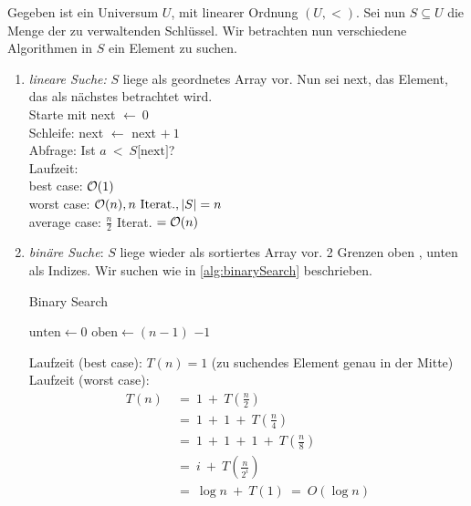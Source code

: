     Gegeben ist ein Universum $U$, mit linearer Ordnung $(U, <)$. Sei nun $S \subseteq U$ die Menge der zu verwaltenden Schlüssel. Wir betrachten nun verschiedene Algorithmen in $S$ ein Element zu suchen.
    \begin{enumerate}[1.] 
        \item \emph{lineare Suche:} $S$ liege als geordnetes Array vor. Nun sei next, das Element, das als nächstes betrachtet wird. \\
        Starte mit next $\leftarrow~0$\\
        Schleife: next $\leftarrow$ next $+~1$\\
        Abfrage: Ist $a~<~S\lbrack\text{next}\rbrack$?\\
        Laufzeit:\\
        best case: $\mathcal{O}(1)$\\
        worst case: $\mathcal{O}(n), n \text{ Iterat.}, |S| = n$\\
        average case: $\frac{n}{2}$ Iterat. $= \mathcal{O}(n)$
        \item \emph{binäre Suche}: $S$ liege wieder als sortiertes Array vor. 2 Grenzen oben , unten als Indizes. Wir suchen wie in \autoref{alg:binarySearch} beschrieben.
            \begin{algorithm}
        		\caption{Binary Search}
        		\label{alg:binarySearch}
        		\begin{algorithmic}[1]
        			    \State $\text{unten} \gets 0$
        			    \State $\text{oben} \gets (n-1)$ 
                            \Else 
                            \EndIf    
        				\EndWhile
        				\State \Return $-1$
        			\EndFunction
        		\end{algorithmic}
        	\end{algorithm}
        Laufzeit (best case): $T(n) = 1$ (zu suchendes Element genau in der Mitte)\\
        Laufzeit (worst case): 
        \begin{align*}
            T(n)~&=~1~+~T \left( \frac{n}{2} \right)\\
            &=~1~+~1~+~T \left( \frac{n}{4} \right)\\
            &=~1~+~1~+~1~+~T \left( \frac{n}{8} \right)\\
            &=~i~+~T \left( \frac{n}{2^{i}} \right)\tag{i-ter Schritt}\\
            &=~\log n~+~T(1)~=~O \left( \log n \right)
        \end{align*}
    \end{enumerate}

